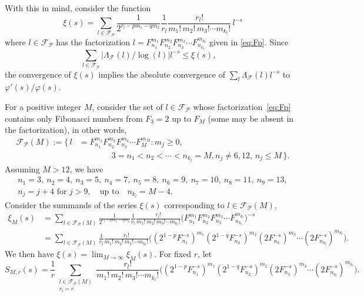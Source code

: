 \documentclass[11pt, a4paper]{article}
\newcommand{\manF}{\Lambda_{\mathcal{F}}}
\newcommand{\Fp}{\mathcal{F}_{\mathcal{P}}}
\theoremstyle{plain}
\theoremstyle{definition}
\begin{document}
With this in mind, consider the function
\[
\xi(s) = \sum_{l \in \Fp} \frac{1}{2^{r_l-pm_1-qm_2}} \frac{1}{r_l} 
\frac{r_l!}{m_1!\,m_2!\,m_3! \cdots m_{k_l}!} \,l^{-s}
\]
where $l \in \Fp$ has the factorization $l = F_{n_1}^{m_1}F_{n_2}^{m_2}F_{n_3}^{m_3}  \cdots F_{n_{k_l}}^{m_{k_l}}$ given in \eqref{eq:Fp}. Since
\[
\sum_{l \in \Fp} |\manF(l)/\log(l)| l^{-s} \le \xi(s),
\quad 
\]
the convergence of $\xi(s)$ implies the absolute convergence of $\sum_l {\manF(l)} l^{-s}$ to $\varphi'(s)/\varphi(s)$. 

For a positive integer $M$, consider the set of $l \in \Fp$ whose factorization~\eqref{eq:Fp} contains only Fibonacci numbers from $F_{3} = 2$ up to $F_{M}$ (some may be absent in the factorization), in other words,
\begin{align*}
\Fp(M) := \big\{\,
l &= F_{n_1}^{m_1}F_{n_2}^{m_2}F_{n_3}^{m_3} \cdots F_{M}^{m_{M}} : m_{j} \ge 0, \\ 
&\qquad\qquad 3 = n_1<n_2<\cdots < n_{k_l} = M,  
n_{j}\neq 6, 12,\, n_j \le M \,\big\}.
\end{align*}
Assuming $M>12$, we have
\begin{equation*}
\begin{gathered}
n_1 = 3,\
n_2 = 4,\
n_3 = 5,\
n_4 = 7,\
n_5 = 8,\
n_6 = 9,\
n_7 = 10,\
n_8 = 11,\
n_9 = 13,\\
n_j = j+4\text{ for }j > 9,
\quad\text{up to}\quad
n_{k_l} = M-4.
\end{gathered}
\end{equation*}
Consider the summands of the series $\xi(s)$ corresponding to $l \in \Fp(M)$,
\begin{align*}
\xi_M(s) &= \sum_{l \in \Fp(M)} \frac{1}{2^{r_l-pm_1-qm_2}} 
  \frac{1}{r_l} \frac{r_l!}{m_1!\,m_2!\,m_3! \cdots m_{k_l}!} 
  \Big(F_{n_1}^{m_1}F_{n_2}^{m_2}F_{n_3}^{m_3} \cdots F_{n_{k_l}}^{m_{k_l}}\Big)^{-s} \\
  &= \sum_{l \in \Fp(M)} \frac{1}{r_l} \frac{r_l!}{m_1!\,m_2!\,m_3! \cdots m_{k_l}!} 
  \Big((2^{1-p}F_{n_1}^{-s})^{m_1} (2^{1-q}F_{n_2}^{-s})^{m_2} (2F_{n_3}^{-s})^{m_3} \cdots (2F_{n_{k_l}}^{-s})^{m_{k_l}}\Big).
\end{align*} 
We then have $\xi(s) = \lim_{M\to\infty} \xi_M(s)$.
For fixed $r$, let
\[
S_{M,r}(s) = \frac{1}{r} \sum_{\substack{l \in \Fp(M)\\ r_l=r}}  
\frac{r_l!}{m_1!\,m_2!\,m_3! \cdots m_{k_l}!} 
  \Big((2^{1-p}F_{n_1}^{-s})^{m_1} (2^{1-q}F_{n_2}^{-s})^{m_2} 
  (2F_{n_3}^{-s})^{m_3} \cdots (2F_{n_{k_l}}^{-s})^{m_{k_l}}\Big).
\]
\end{document}
